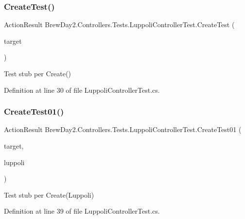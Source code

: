 \subsubsection{\texorpdfstring{Create\+Test()}{CreateTest()}}
{\footnotesize\ttfamily Action\+Result Brew\+Day2.\+Controllers.\+Tests.\+Luppoli\+Controller\+Test.\+Create\+Test (\begin{DoxyParamCaption}\item[{\mbox{[}\+Pex\+Assume\+Under\+Test\mbox{]} \mbox{\hyperlink{class_brew_day2_1_1_controllers_1_1_luppoli_controller}{Luppoli\+Controller}}}]{target }\end{DoxyParamCaption})}



Test stub per Create()



Definition at line 30 of file Luppoli\+Controller\+Test.\+cs.

\mbox{\label{class_brew_day2_1_1_controllers_1_1_tests_1_1_luppoli_controller_test_ac1cfc6c36411d15c90db816e89bc5514}} 
\subsubsection{\texorpdfstring{Create\+Test01()}{CreateTest01()}}
{\footnotesize\ttfamily Action\+Result Brew\+Day2.\+Controllers.\+Tests.\+Luppoli\+Controller\+Test.\+Create\+Test01 (\begin{DoxyParamCaption}\item[{\mbox{[}\+Pex\+Assume\+Under\+Test\mbox{]} \mbox{\hyperlink{class_brew_day2_1_1_controllers_1_1_luppoli_controller}{Luppoli\+Controller}}}]{target,  }\item[{\mbox{\hyperlink{class_brew_day2_1_1_models_1_1_luppoli}{Luppoli}}}]{luppoli }\end{DoxyParamCaption})}



Test stub per Create(\+Luppoli)



Definition at line 39 of file Luppoli\+Controller\+Test.\+cs.

